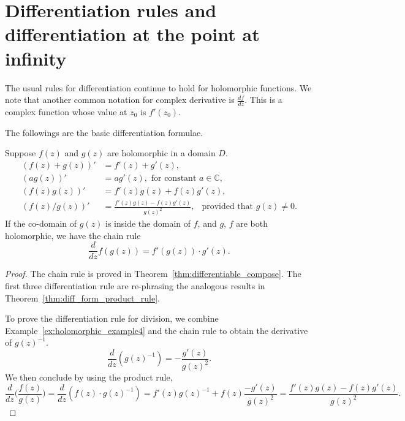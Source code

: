 



\section{Differentiation rules and differentiation at the point at infinity}

The usual rules for differentiation continue to hold for holomorphic functions. We note that another common notation for complex derivative is $\frac{df}{dz}$. This is a complex function whose value at $z_0$ is $f'(z_0)$.

The followings are the basic differentiation formulae. 
\begin{svgraybox}
	\begin{theorem} 
		Suppose $f(z)$ and $g(z)$ are holomorphic in a domain $D$. 
		\begin{align*}
			(f(z) + g(z))' &= f'(z)+ g'(z) ,\\
			(a g(z))' &= a g'(z), \text{ for constant } a \in \mathbb{C}, \\
			(f(z)g(z))' &= f'(z)g(z) + f(z) g'(z), \\
			(f(z)/g(z))' &= \frac{f'(z)g(z) - f(z) g'(z)}{g(z)^2}, \ \ \text{ provided that } g(z)\neq 0.
		\end{align*}
		If the co-domain of $g(z)$ is inside the domain of $f$, and $g$, $f$ are both holomorphic, we have the chain rule
		$$
		\frac{d}{dz} f(g(z)) = f'(g(z)) \cdot g'(z).
		$$
	\end{theorem}
\end{svgraybox}

\begin{proof} The chain rule is proved in Theorem~\ref{thm:differentiable_compose}.
	The first three differentiation rule are re-phrasing the analogous results in Theorem~\ref{thm:diff_form_product_rule}. 
	
	To prove the differentiation rule for division, we combine Example~\ref{ex:holomorphic_example4} and the chain rule to obtain the derivative of $g(z)^{-1}$.
	$$
	\frac{d}{dz}( g(z)^{-1}) = -\frac{g'(z)}{g(z)^2}.
	$$
	We then conclude by using the product rule,
	$$
	\frac{d }{dz} \Big( \frac{f(z)}{g(z)}  \Big) =
	\frac{d }{dz} (f(z) \cdot g(z)^{-1}) = f'(z) g(z)^{-1} + f(z) \frac{-g'(z)}{g(z)^2}
	= \frac{f'(z)g(z) - f(z) g'(z)}{g(z)^2}.
	$$
\end{proof}

